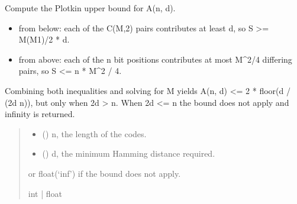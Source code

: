 \documentclass[letterpaper,10pt,english]{sphinxmanual}
\begin{document}

\begin{fulllineitems}
\label{\detokenize{index:hammindist.functions.plotkin_bound}}
\pysigstartsignatures
\pysiglinewithargsret
{}
{\sphinxparamcomma {}}
{}
\pysigstopsignatures
\sphinxAtStartPar
Compute the Plotkin upper bound for A(n, d).
\begin{description}
\begin{itemize}
\item {} 
\sphinxAtStartPar
from below: each of the C(M,2) pairs contributes at least d,
so S \textgreater{}= M(M\sphinxhyphen{}1)/2 * d.

\item {} 
\sphinxAtStartPar
from above: each of the n bit positions contributes at most
M\textasciicircum{}2/4 differing pairs, so S \textless{}= n * M\textasciicircum{}2 / 4.

\end{itemize}

\end{description}

\sphinxAtStartPar
Combining both inequalities and solving for M yields
A(n, d) \textless{}= 2 * floor(d / (2d \sphinxhyphen{} n)), but only when 2d \textgreater{} n.
When 2d \textless{}= n the bound does not apply and infinity is returned.
\begin{quote}\begin{description}
\begin{itemize}
\item {} 
\sphinxAtStartPar
{} () \textendash{} n, the length of the codes.

\item {} 
\sphinxAtStartPar
{} () \textendash{} d, the minimum Hamming distance required.

\end{itemize}

\sphinxAtStartPar
\begin{description}
\sphinxAtStartPar
or float(‘inf’) if the bound does not apply.

\end{description}


\sphinxAtStartPar
int | float

\end{description}\end{quote}

\end{fulllineitems}
\end{document}
